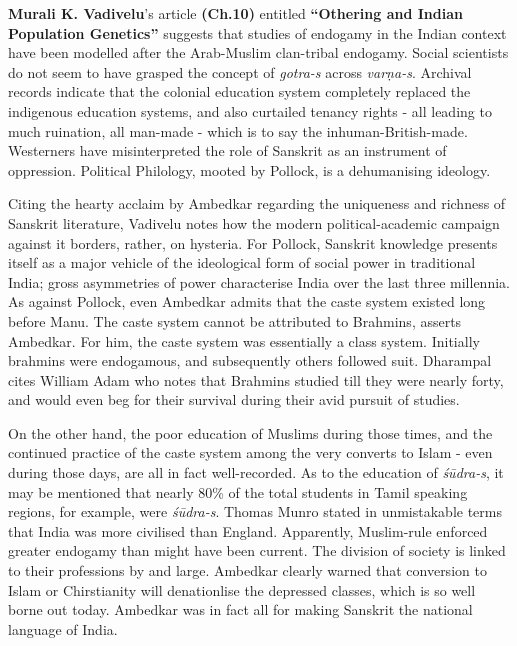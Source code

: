 \textbf{Murali K. Vadivelu}’s article \textbf{(Ch.10)} entitled \textbf{“Othering and Indian Population Genetics”} suggests that studies of endogamy in the Indian context have been modelled after the Arab-Muslim clan-tribal endogamy. Social scientists do not seem to have grasped the concept of \textit{gotra-s} across \textit{varṇa-s}. Archival records indicate that the colonial education system completely replaced the indigenous education systems, and also curtailed tenancy rights - all leading to much ruination, all man-made - which is to say the inhuman-British-made. Westerners have misinterpreted the role of Sanskrit as an instrument of oppression. Political Philology, mooted by Pollock, is a dehumanising ideology.

\vspace {.15cm}

Citing the hearty acclaim by Ambedkar regarding the uniqueness and richness of Sanskrit literature, Vadivelu notes how the modern political-academic campaign against it borders, rather, on hysteria. For Pollock, Sanskrit knowledge presents itself as a major vehicle of the ideological form of social power in traditional India; gross asymmetries of power characterise India over the last three millennia. As against Pollock, even Ambedkar admits that the caste system existed long before Manu. The caste system cannot be attributed to Brahmins, asserts Ambedkar. For him, the caste system was essentially a class system. Initially brahmins were endogamous, and subsequently others followed suit. Dharampal cites William Adam who notes that Brahmins studied till they were nearly forty, and would even beg for their survival during their avid pursuit of studies.

\vspace {.15cm}

On the other hand, the poor education of Muslims during those times, and the continued practice of the caste system among the very converts to Islam - even during those days, are all in fact well-recorded. As to the education of \textit{śūdra-s}, it may be mentioned that nearly 80\% of the total students in Tamil speaking regions, for example, were \textit{śūdra-s}. Thomas Munro stated in unmistakable terms that India was more civilised than England. Apparently, Muslim-rule enforced greater endogamy than might have been current. The division of society is linked to their professions by and large. Ambedkar clearly warned that conversion to Islam or Chirstianity will denationlise the depressed classes, which is so well borne out today. Ambedkar was in fact all for making Sanskrit the national language of India.

